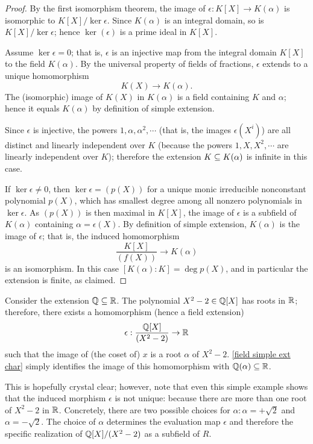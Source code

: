 \begin{proof}
By the first isomorphism theorem, the image of $\epsilon:K[X]\to K(\alpha)$ is isomorphic to $K[X]/\ker\epsilon$. Since $K(\alpha)$ is an integral domain, so is $K[X]/\ker\epsilon$; hence $\ker(\epsilon)$ is a prime ideal in $K[X]$.\par
Assume $\ker\epsilon=0$; that is, $\epsilon$ is an injective map from the integral domain $K[X]$ to the field $K(\alpha)$. By the universal property of fields of fractions, $\epsilon$ extends to a unique homomorphism
\[K(X)\to K(\alpha).\]
The (isomorphic) image of $K(X)$ in $K(\alpha)$ is a field containing $K$ and $\alpha$; hence it equals $K(\alpha)$ by definition of simple extension.\par
Since $\epsilon$ is injective, the powers $1,\alpha,\alpha^2,\cdots$ (that is, the images $\epsilon(X^i)$) are all distinct and linearly independent over $K$ (because the powers $1,X,X^2,\cdots$ are linearly independent over $K$); therefore the extension $K\subseteq K(\alpha)$ is infinite in this case.\par
If $\ker\epsilon\neq0$, then $\ker\epsilon=(p(X))$ for a unique monic irreducible nonconstant polynomial $p(X)$, which has smallest degree among all nonzero polynomials in $\ker\epsilon$. As $(p(X))$ is then maximal in $K[X]$, the image of $\epsilon$ is a subfield of $K(\alpha)$ containing $\alpha=\epsilon(X)$. By definition of simple extension, $K(\alpha)$ is the image of $\epsilon$; that is, the induced homomorphism
\[\dfrac{K[X]}{(f(X))}\to K(\alpha)\]
is an isomorphism. In this case $[K(\alpha):K]=\deg p(X)$, and in particular the extension is finite, as claimed.
\end{proof}
\begin{example}
Consider the extension $\mathbb{Q}\subseteq\mathbb{R}$. The polynomial $X^2-2\in\mathbb{Q}[X]$ has roots in $\mathbb{R}$; therefore, there exists a homomorphism (hence a field extension)
\[\epsilon:\dfrac{\mathbb{Q}[X]}{(X^2-2)}\to\mathbb{R}\]
such that the image of (the coset of) $x$ is a root $\alpha$ of $X^2-2$. \cref{field simple ext char} simply identifies the image of this homomorphism with $\mathbb{Q}(\alpha)\subseteq\mathbb{R}$.\par
This is hopefully crystal clear; however, note that even this simple example shows that the induced morphism $\epsilon$ is not unique: because there are more than one root of $X^2-2$ in $\mathbb{R}$. Concretely, there are two possible choices for $\alpha:\alpha=+\sqrt{2}$ and $\alpha=-\sqrt{2}$. The choice of $\alpha$ determines the evaluation map $\epsilon$ and therefore the specific realization of $\mathbb{Q}[X]/(X^2-2)$ as a subfield of $R$.\end{example}

